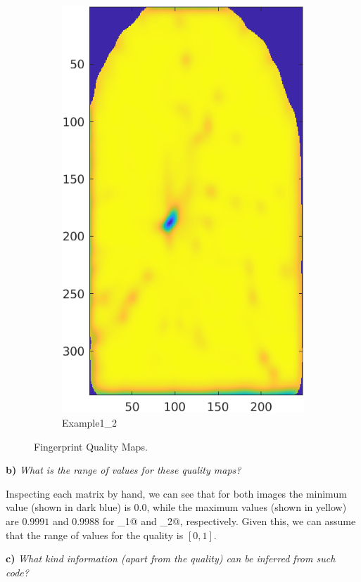 \documentclass[11pt]{article}
\begin{document}
\begin{figure}[h!]
\begin{subfigure}[t]{0.45\textwidth}
         \includegraphics[scale=0.675]{img/qmap_2}
         \caption{Example1\_2}
     \end{subfigure}
    \caption{Fingerprint Quality Maps.}
    \label{fig:ex3a}
\end{figure}

\textbf{b) }\emph{What is the range of values for these quality maps?}

Inspecting each matrix by hand, we can see that for both images the minimum value (shown in dark blue) is \( 0.0 \), while the maximum values (shown in yellow) are \( 0.9991 \) and \(  0.9988 \) for _1@ and _2@, respectively. Given this, we can assume that the range of values for the quality is \( [0, 1] \).

\textbf{c) }\emph{What kind information (apart from the quality) can be inferred from such code?}
\end{document}
